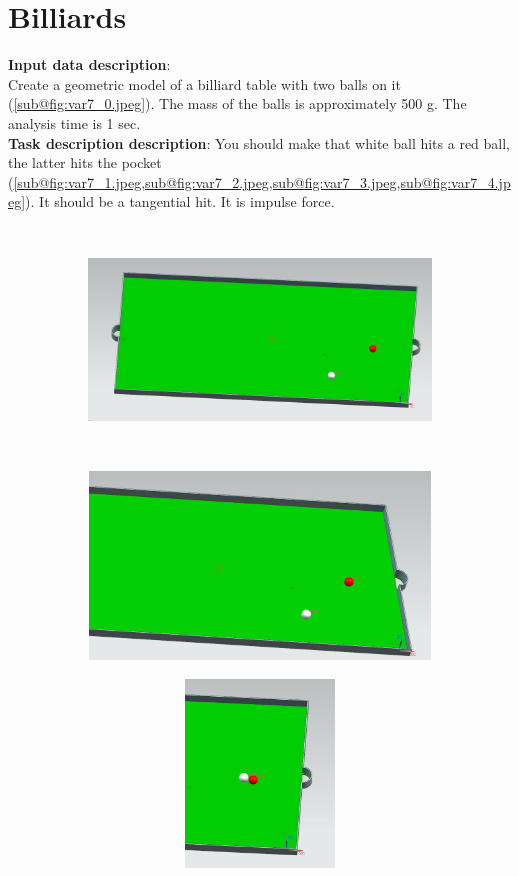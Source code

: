 \documentclass[12pt]{article}
\newcommand\ttask[3] 
 {
	\section*{#1}
	\textbf{Input data description}: \\ #2 \  \\
	\textbf{Task description description}: #3
	\newpage
 }
\begin{document}
\ttask{Billiards}{
	Create a geometric model of a billiard table with two balls on it (\cref{sub@fig:var7_0.jpeg}). The mass of the balls is approximately 500 g. The analysis time is 1 sec.
}{
	You should make that white ball hits a red ball, the latter hits the pocket (\cref{sub@fig:var7_1.jpeg,sub@fig:var7_2.jpeg,sub@fig:var7_3.jpeg,sub@fig:var7_4.jpeg}). It should be a tangential hit. It is impulse force.

	\begin{figure}[H]
		\begin{subfigure}{0.90\textwidth}
			\centering\includegraphics[height=6cm,width=1\textwidth,keepaspectratio]{var7_0.jpeg}
			\caption{}
			\label{fig:var7_0.jpeg}
		\end{subfigure}

		\begin{subfigure}{0.49\textwidth}
			\centering\includegraphics[height=5cm,width=1\textwidth,keepaspectratio]{var7_1.jpeg}
			\caption{}
			\label{fig:var7_1.jpeg}
		\end{subfigure}
		\begin{subfigure}{0.49\textwidth}
			\centering\includegraphics[height=5cm,width=1\textwidth,keepaspectratio]{var7_2.jpeg}
			\caption{}
			\label{fig:var7_2.jpeg}
		\end{subfigure}


\end{figure}}
\end{document}
